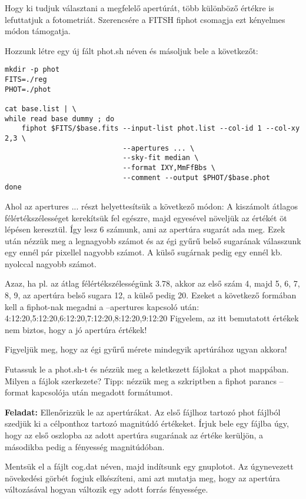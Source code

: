 \documentclass{article}
\begin{document}
Hogy ki tudjuk választani a megfelelő apertúrát, több különböző értékre is
lefuttatjuk a fotometriát. Szerencsére a FITSH fiphot csomagja ezt kényelmes
módon támogatja.

Hozzunk létre egy új fált phot.sh néven és másoljuk bele a következőt:

\begin{verbatim}
mkdir -p phot
FITS=./reg
PHOT=./phot

cat base.list | \
while read base dummy ; do
    fiphot $FITS/$base.fits --input-list phot.list --col-id 1 --col-xy 2,3 \
                            --apertures ... \
                            --sky-fit median \
                            --format IXY,MmFfBbs \
                            --comment --output $PHOT/$base.phot
done
\end{verbatim}

Ahol az apertures ... részt helyettesítsük a következő módon:
A kiszámolt átlagos félértékszélességet kerekítsük fel egészre, majd egyesével
növeljük az értékét öt lépésen keresztül. Így lesz 6 számunk, ami az apertúra
sugarát ada meg. Ezek után nézzük meg a legnagyobb számot és az égi gyűrű belső
sugarának válasszunk egy ennél pár pixellel nagyobb számot. A külső sugárnak
pedig egy ennél kb. nyolccal nagyobb számot.

Azaz, ha pl. az átlag félértékszélességünk 3.78, akkor az első szám 4, majd 5,
6, 7, 8, 9, az apertúra belső sugara 12, a külső pedig 20.
Ezeket a következő formában kell a fiphot-nak megadni a --apertures kapcsoló
után:
4:12:20,5:12:20,6:12:20,7:12:20,8:12:20,9:12:20
Figyelem, az itt bemutatott értékek nem biztos, hogy a jó apertúra értékek!

Figyeljük meg, hogy az égi gyűrű mérete mindegyik aprtúrához ugyan akkora!

Futassuk le a phot.sh-t és nézzük meg a keletkezett fájlokat a phot mappában.
Milyen a fájlok szerkezete? Tipp: nézzük meg a szkriptben a fiphot parancs
--format kapcsolója után megadott formátumot.

{\bf Feladat:}
Ellenőrizzük le az apertúrákat.
Az első fájlhoz tartozó phot fájlból szedjük ki a célponthoz tartozó
magnitúdó értékeket. Írjuk bele egy fájlba úgy, hogy az első oszlopba az adott
apertúra sugarának az értéke kerüljön, a másodikba pedig a fényesség
magnitúdóban.

Mentsük el a fájlt cog.dat néven, majd indítsunk egy gnuplotot. Az úgynevezett
növekedési görbét fogjuk elkészíteni, ami azt mutatja meg, hogy az apertúra
változásával hogyan változik egy adott forrás fényessége.
\end{document}
